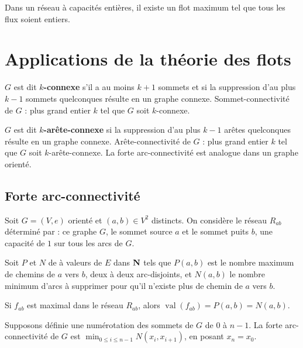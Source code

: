 \documentclass[a4paper,11pt,twocolumn]{article}
\DeclareMathOperator{\val}{val}
\begin{document}
	\begin{thm}
	Dans un réseau à capacités entières, il existe un flot maximum tel que tous les flux soient entiers.
	\end{thm}


\section{Applications de la théorie des flots}

	\begin{defn}
	$G$ est dit \textbf{$k$-connexe} s’il a au moins $k + 1$ sommets et si la suppression d’au plus $k - 1$ sommets quelconques résulte en un graphe connexe.
	Sommet-connectivité de $G$ : plus grand entier $k$ tel que $G$ soit $k$-connexe.
	\end{defn}

	\begin{defn}
	$G$ est dit \textbf{$k$-arête-connexe} si la suppression d’au plus $k - 1$ arêtes quelconques résulte en un graphe connexe.
	Arête-connectivité de $G$ : plus grand entier $k$ tel que $G$ soit $k$-arête-connexe.
	La forte arc-connectivité est analogue dans un graphe orienté.
	\end{defn}

	\subsection{Forte arc-connectivité}

		\begin{note}
		Soit $G = (V,e)$ orienté et $(a,b) \in V^2$ distincts.
		On considère le réseau $R_{ab}$ déterminé par : ce graphe $G$, le sommet source $a$ et le sommet puits $b$, une capacité de $1$ sur tous les arcs de $G$.
		\end{note}

		\begin{note}
		Soit $P$ et $N$ de à valeurs de $E$ dans $\mathbf{N}$ tels que $P(a,b)$ est le nombre maximum de chemins de $a$ vers $b$, deux à deux arc-disjoints, et $N(a,b)$ le nombre minimum d’arcs à supprimer pour qu’il n’existe plus de chemin de $a$ vers $b$.
		\end{note}

		\begin{thm}
		Si $f_{ab}$ est maximal dans le réseau $R_{ab}$, alors $\val(f_{ab}) = P(a,b) = N(a,b)$.
		\end{thm}

		\begin{lem}[Zorn]
		Supposons définie une numérotation des sommets de $G$ de $0$ à $n - 1$.
		La forte arc-connectivité de $G$ est $\min_{0 \leq i \leq n-1} N(x_i,x_{i+1})$, en posant $x_n = x_0$.
		\end{lem}
\end{document}
